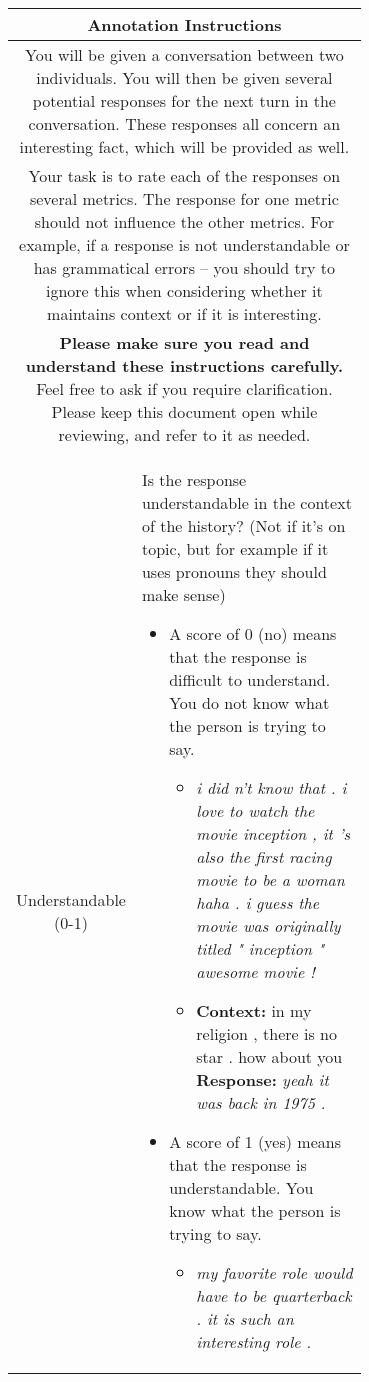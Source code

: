 \documentclass[11pt,a4paper]{article}
\begin{document}
\begin{table*}
    \begin{tabular}{|c|p{0.7\linewidth}|}
        \hline
        \multicolumn{2}{|c|}{\textbf{Annotation Instructions}} \\ \hline
        \multicolumn{2}{|p{\linewidth}|}{You will be given a conversation between two individuals. You will then be given several potential responses for the next turn in the conversation. These responses all concern an interesting fact, which will be provided as well.} \\
        \multicolumn{2}{|p{\linewidth}|}{Your task is to rate each of the responses on several metrics. The response for one metric should not influence the other metrics. For example, if a response is not understandable or has grammatical errors -- you should try to ignore this when considering whether it maintains context or if it is interesting.} \\
        \multicolumn{2}{|p{\linewidth}|}{\textbf{Please make sure you read and understand these instructions carefully.} Feel free to ask if you require clarification. Please keep this document open while reviewing, and refer to it as needed.} \\ \hline
        Understandable (0-1) &  Is the response understandable in the context of the history? (Not if it’s on topic, but for example if it uses pronouns they should make sense) 
        \begin{itemize}
            \item A score of 0 (no) means that the response is difficult to understand. You do not know what the person is trying to say. \begin{itemize}
                \item \textit{i did n't know that . i love to watch the movie inception , it 's also the first racing movie to be a woman haha . i guess the movie was originally titled " inception " awesome movie !}
                \item \textbf{Context:} in my religion , there is no star . how about you \textbf{Response:} \textit{yeah it was back in 1975 .}
            \end{itemize}
            \item A score of 1 (yes) means that the response is understandable. You know what the person is trying to say. \begin{itemize}
                \item \textit{my favorite role would have to be quarterback . it is such an interesting role .}

\end{itemize}
\end{itemize}
\end{tabular}
\end{table*}
\end{document}
